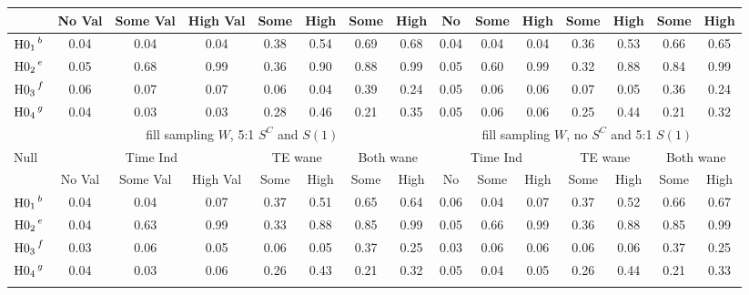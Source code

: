 \documentclass[times, 11pt]{article}
\begin{document}
\begin{table} [H]
\begin{tabular}{l|ccc|cc|cc|ccc|cc|cc}
&No Val&Some Val&High Val&Some&High&Some&High&No&Some&High&Some&High&Some&High\\
\hline
${\mbox{H0}_1}^{\hspace{0.5mm}b}$& 0.04 & 0.04 & 0.04 & 0.38 & 0.54 & 0.69 & 0.68 & 0.04 & 0.04 & 0.04 & 0.36 & 0.53 & 0.66 & 0.65 \\ 
${\mbox{H0}_2}^{\hspace{0.5mm}e}$&0.05 & 0.68 & 0.99 & 0.36 & 0.90 & 0.88 & 0.99 & 0.05 & 0.60 & 0.99 & 0.32 & 0.88 & 0.84 & 0.99 \\ 
${\mbox{H0}_3}^{\hspace{0.5mm}f}$&0.06 & 0.07 &0.07 & 0.06 & 0.04 & 0.39 & 0.24 & 0.05 & 0.06 & 0.06 & 0.07 & 0.05 & 0.36 & 0.24 \\
${\mbox{H0}_4}^{\hspace{0.5mm}g}$&0.04 & 0.03 & 0.03 & 0.28 & 0.46 & 0.21 & 0.35 & 0.05 & 0.06 & 0.06 & 0.25 & 0.44 & 0.21 & 0.32 \\ 
\hline
\hline
&\multicolumn{7}{c}{fill sampling $W$, 5:1 $S^{C}$ and $S(1)$} &\multicolumn{7}{c}{fill sampling $W$, no $S^{C}$ and 5:1 $S(1)$}\\
Null&\multicolumn{3}{c}{Time Ind}&\multicolumn{2}{c}{TE wane}&\multicolumn{2}{c}{Both wane}&\multicolumn{3}{c}{Time Ind}&\multicolumn{2}{c}{TE wane}&\multicolumn{2}{c}{Both wane}\\
&No Val&Some Val&High Val&Some&High&Some&High&No&Some&High&Some&High&Some&High\\
\hline
${\mbox{H0}_1}^{\hspace{0.5mm}b}$& 0.04 & 0.04 & 0.07 & 0.37 & 0.51 & 0.65 & 0.64 & 0.06 & 0.04 & 0.07 & 0.37 & 0.52 & 0.66 & 0.67 \\ 
${\mbox{H0}_2}^{\hspace{0.5mm}e}$& 0.04 & 0.63 & 0.99 & 0.33 & 0.88 & 0.85 & 0.99 & 0.05 & 0.66 & 0.99 & 0.36 & 0.88 & 0.85 & 0.99 \\
${\mbox{H0}_3}^{\hspace{0.5mm}f}$ & 0.03 & 0.06 & 0.05 & 0.06 & 0.05 & 0.37 & 0.25 & 0.03 & 0.06 & 0.06 & 0.06 & 0.06 & 0.37 & 0.25 \\  
${\mbox{H0}_4}^{\hspace{0.5mm}g}$& 0.04 & 0.03 & 0.06 & 0.26 & 0.43 & 0.21 & 0.32 & 0.05 & 0.04 & 0.05 & 0.26 & 0.44 & 0.21 & 0.33\\ 
\hline
\normalsize
\end{tabular}
\end{table}
\end{document}
